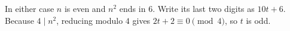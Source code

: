 In either case $n$ is even and $n^2$ ends in $6$. Write its last two digits as $10t+6$. Because $4\mid n^2$, reducing modulo $4$ gives $2t+2\equiv0\pmod4$, so $t$ is odd.
